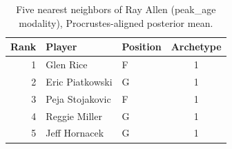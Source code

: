 \begin{table}[htbp]
  \centering\small
  \begin{tabular}{rllc}
    \toprule
    Rank & Player & Position & Archetype \\
    \midrule
    1 & Glen Rice & F & 1 \\
    2 & Eric Piatkowski & G & 1 \\
    3 & Peja Stojakovic & F & 1 \\
    4 & Reggie Miller & G & 1 \\
    5 & Jeff Hornacek & G & 1 \\
    \bottomrule
  \end{tabular}
  \caption{Five nearest neighbors of Ray Allen (peak_age modality), Procrustes-aligned posterior mean.}
  \label{tab:Ray_Allen_neighbors_peak_age}
\end{table}

